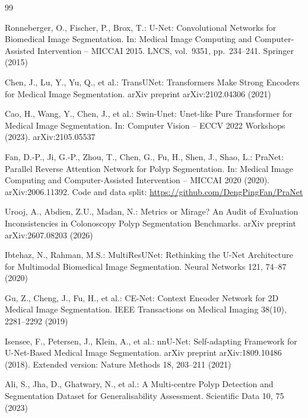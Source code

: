\begin{thebibliography}{99}
\setlength{\itemsep}{5pt plus 1pt}

Ronneberger, O., Fischer, P., Brox, T.: U-Net: Convolutional Networks for
Biomedical Image Segmentation. In: Medical Image Computing and
Computer-Assisted Intervention -- MICCAI 2015. LNCS, vol.~9351, pp.~234--241.
Springer (2015)

Chen, J., Lu, Y., Yu, Q., et al.: TransUNet: Transformers Make Strong Encoders
for Medical Image Segmentation. arXiv preprint arXiv:2102.04306 (2021)

Cao, H., Wang, Y., Chen, J., et al.: Swin-Unet: Unet-like Pure Transformer for
Medical Image Segmentation. In: Computer Vision -- ECCV 2022 Workshops (2023).
arXiv:2105.05537

Fan, D.-P., Ji, G.-P., Zhou, T., Chen, G., Fu, H., Shen, J., Shao, L.: PraNet:
Parallel Reverse Attention Network for Polyp Segmentation. In: Medical Image
Computing and Computer-Assisted Intervention -- MICCAI 2020 (2020).
arXiv:2006.11392. Code and data split: \url{https://github.com/DengPingFan/PraNet}

Urooj, A., Abdien, Z.U., Madan, N.: Metrics or Mirage? An Audit of Evaluation
Inconsistencies in Colonoscopy Polyp Segmentation Benchmarks. arXiv preprint
arXiv:2607.08203 (2026)

Ibtehaz, N., Rahman, M.S.: MultiResUNet: Rethinking the U-Net Architecture for
Multimodal Biomedical Image Segmentation. Neural Networks 121, 74--87
(2020)

Gu, Z., Cheng, J., Fu, H., et al.: CE-Net: Context Encoder Network for 2D
Medical Image Segmentation. IEEE Transactions on Medical Imaging
38(10), 2281--2292 (2019)

Isensee, F., Petersen, J., Klein, A., et al.: nnU-Net: Self-adapting Framework
for U-Net-Based Medical Image Segmentation. arXiv preprint arXiv:1809.10486
(2018). Extended version: Nature Methods 18, 203--211 (2021)

Ali, S., Jha, D., Ghatwary, N., et al.: A Multi-centre Polyp Detection and
Segmentation Dataset for Generalisability Assessment. Scientific Data
10, 75 (2023)


\end{thebibliography}
